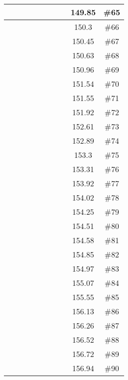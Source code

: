 \begin{center}
\begin{longtable}{|c|c|c|c|c|c|c|c|c|c|}
 \x &  \x &  \x &  \x &  &  \x &  &  & 149.85 & \#65 \\ \hline
 \x &  &  &  &  &  \x &  \x &  \x & 150.3 & \#66 \\ \hline
 \x &  \x &  \x &  \x &  &  &  \x &  & 150.45 & \#67 \\ \hline
 \x &  &  \x &  \x &  \x &  &  &  & 150.63 & \#68 \\ \hline
 \x &  &  \x &  \x &  &  \x &  &  & 150.96 & \#69 \\ \hline
 \x &  &  \x &  &  \x &  \x &  &  & 151.54 & \#70 \\ \hline
 \x &  &  &  &  \x &  \x &  &  \x & 151.55 & \#71 \\ \hline
 \x &  &  \x &  &  &  \x &  \x &  \x & 151.92 & \#72 \\ \hline
 \x &  \x &  &  &  \x &  \x &  \x &  & 152.61 & \#73 \\ \hline
 \x &  \x &  \x &  &  \x &  &  \x &  & 152.89 & \#74 \\ \hline
 \x &  \x &  &  &  &  &  \x &  & 153.3 & \#75 \\ \hline
 \x &  \x &  &  &  \x &  &  \x &  & 153.31 & \#76 \\ \hline
 \x &  &  &  &  &  &  \x &  & 153.92 & \#77 \\ \hline
 \x &  &  \x &  \x &  &  &  &  & 154.02 & \#78 \\ \hline
 \x &  \x &  \x &  \x &  \x &  &  &  \x & 154.25 & \#79 \\ \hline
 \x &  \x &  \x &  &  \x &  &  \x &  \x & 154.51 & \#80 \\ \hline
 \x &  &  &  &  \x &  &  \x &  & 154.58 & \#81 \\ \hline
 \x &  \x &  &  &  &  \x &  \x &  & 154.85 & \#82 \\ \hline
 \x &  \x &  &  \x &  &  &  \x &  & 154.97 & \#83 \\ \hline
 \x &  \x &  &  \x &  \x &  &  \x &  \x & 155.07 & \#84 \\ \hline
 \x &  \x &  &  \x &  &  &  \x &  \x & 155.55 & \#85 \\ \hline
 \x &  &  &  &  \x &  &  \x &  \x & 156.13 & \#86 \\ \hline
 \x &  \x &  \x &  \x &  \x &  &  &  & 156.26 & \#87 \\ \hline
 \x &  &  \x &  \x &  &  &  \x &  \x & 156.52 & \#88 \\ \hline
 \x &  &  \x &  \x &  \x &  &  \x &  & 156.72 & \#89 \\ \hline
 \x &  \x &  &  \x &  \x &  &  &  & 156.94 & \#90 \\ \hline

\end{longtable}
\end{center}
